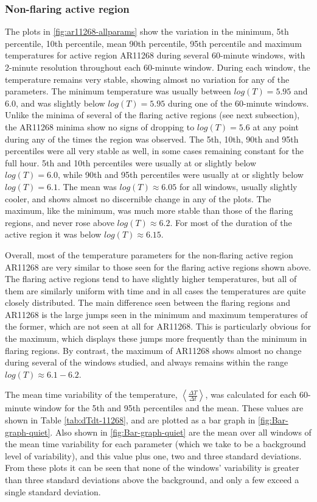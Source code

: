 \documentclass{article}
\begin{document}
\subsubsection{Non-flaring active region}
The plots in \ref{fig:ar11268-allparams} show the variation in the
minimum, 5th percentile, 10th percentile, mean 90th percentile, 95th
percentile and maximum temperatures for active region AR11268 during
several 60-minute windows, with 2-minute resolution throughout each
60-minute window. During each window, the temperature remains very
stable, showing almost no variation for any of the parameters. The
minimum temperature was usually between $log(T)=5.95$ and $6.0$,
and was slightly below $log(T)=5.95$ during one of the 60-minute
windows. Unlike the minima of several of the flaring active regions
(see next subsection), the AR11268 minima show no signs of dropping
to $log(T)=5.6$ at any point during any of the times the region was
observed. The 5th, 10th, 90th and 95th percentiles were all very stable
as well, in some cases remaining constant for the full hour. 5th and
10th percentiles were usually at or slightly below $log(T)=6.0$,
while 90th and 95th percentiles were usually at or slightly below
$log(T)=6.1$. The mean was $log(T)\approx6.05$ for all windows,
usually slightly cooler, and shows almost no discernible change in
any of the plots. The maximum, like the minimum, was much more stable
than those of the flaring regions, and never rose above $log(T)\approx6.2$.
For most of the duration of the active region it was below $log(T)\approx6.15$.

Overall, most of the temperature parameters for the non-flaring active
region AR11268 are very similar to those seen for the flaring active
regions shown above. The flaring active regions tend to have slightly
higher temperatures, but all of them are similarly uniform with time
and in all cases the temperatures are quite closely distributed. The
main difference seen between the flaring regions and AR11268 is the
large jumps seen in the minimum and maximum temperatures of the former,
which are not seen at all for AR11268. This is particularly obvious
for the maximum, which displays these jumps more frequently than the
minimum in flaring regions. By contrast, the maximum of AR11268 shows
almost no change during several of the windows studied, and always
remains within the range $log(T)\approx6.1-6.2$. 

The mean time variability of the temperature, $\left\langle \frac{\Delta T}{\Delta t}\right\rangle $,
was calculated for each 60-minute window for the 5th and 95th percentiles
and the mean. These values are shown in Table \ref{tab:dTdt-11268},
and are plotted as a bar graph in \ref{fig:Bar-graph-quiet}. Also
shown in \ref{fig:Bar-graph-quiet} are the mean over all windows
of the mean time variability for each parameter (which we take to
be a background level of variability), and this value plus one, two
and three standard deviations. From these plots it can be seen that
none of the windows' variability is greater than three standard deviations
above the background, and only a few exceed a single standard deviation.
\end{document}
